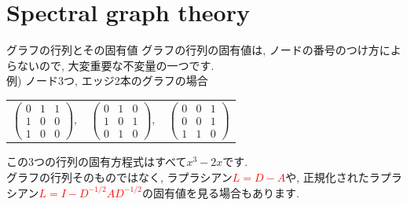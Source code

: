 \documentclass[dvipdfmx,11pt]{beamer}
\theoremstyle{definition}
\begin{document}
\section{Spectral graph theory}
\begin{frame}{グラフの行列とその固有値}
グラフの行列の固有値は, ノードの番号のつけ方によらないので, 大変重要な不変量の一つです. \\ 
例) ノード3つ, エッジ2本のグラフの場合
\begin{table}[h]
\begin{tabular}{ccc}
$\begin{pmatrix}
0 & 1 & 1 \\
1 & 0 & 0 \\
1 & 0 & 0
\end{pmatrix},$ & 
$\begin{pmatrix}
0 & 1 & 0 \\
1 & 0 & 1 \\
0 & 1 & 0 
\end{pmatrix},$ & 
$\begin{pmatrix}
0 & 0 & 1 \\ 
0 & 0 & 1 \\
1 & 1 & 0 
\end{pmatrix}$ 
\end{tabular}
\end{table}
この3つの行列の固有方程式はすべて$x^3 - 2x$です. \\ 
\vspace{0.4cm}
グラフの行列そのものではなく, ラプラシアン\textcolor{red}{$L = D - A$}や, 正規化されたラプラシアン\textcolor{red}{$L = I - D^{-1/2}A D^{-1/2}$}の固有値を見る場合もあります.
\end{frame}
\end{document}
